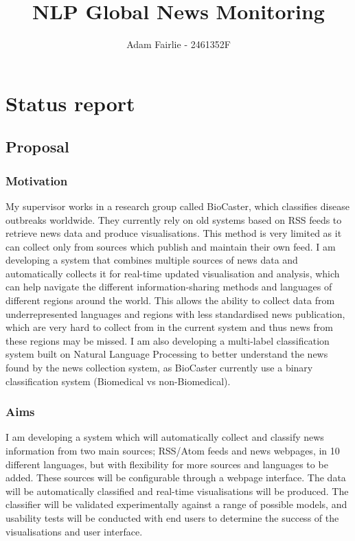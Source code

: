 \documentclass[11pt]{article}
\title{ NLP Global News Monitoring }
\author{ Adam Fairlie - 2461352F }
\begin{document}
    \maketitle
    
    
     

\section{Status report}

\subsection{Proposal}\label{proposal}

\subsubsection{Motivation}\label{motivation}
My supervisor works in a research group called BioCaster, which classifies disease outbreaks worldwide. They currently rely on old systems based on RSS feeds to retrieve news data and produce visualisations. This method is very limited as it can collect only from sources which publish and maintain their own feed. I am developing a system that combines multiple sources of news data and automatically collects it for real-time updated visualisation and analysis, which can help navigate the different information-sharing methods and languages of different regions around the world. This allows the ability to collect data from underrepresented languages and regions with less standardised news publication, which are very hard to collect from in the current system and thus news from these regions may be missed. I am also developing a multi-label classification system built on Natural Language Processing to better understand the news found by the news collection system, as BioCaster currently use a binary classification system (Biomedical vs non-Biomedical).

\subsubsection{Aims}\label{aims}

I am developing a system which will automatically collect and classify news information from two main sources; RSS/Atom feeds and news webpages, in 10 different languages, but with flexibility for more sources and languages to be added. These sources will be configurable through a webpage interface. The data will be automatically classified and real-time visualisations will be produced. The classifier will be validated experimentally against a range of possible models, and usability tests will be conducted with end users to determine the success of the visualisations and user interface.
\end{document}
